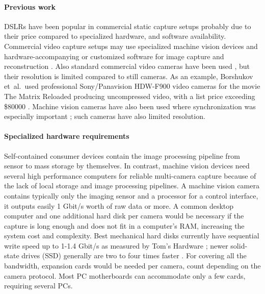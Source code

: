 \paragraph{Previous work}
DSLRs have been popular in commercial static capture setups \cite{ir-ltd,ten24,capturelab,agisoftforum,winder2008technical} probably due to their price compared to specialized hardware, and software availability.
Commercial video capture setups may use specialized machine vision devices and hardware-accompanying or customized software for image capture and reconstruction \cite{al2013new}.
Also standard commercial video cameras have been used \cite{bradley2010high}, but their resolution is limited compared to still cameras.
As an example, Borshukov et~al.\ used professional Sony/Panavision HDW-F900 video cameras for the movie The Matrix Reloaded \cite{borshukov05universal} producing uncompressed video, with a list price exceeding \$80000 \cite{sonyhdwf900r}.
Machine vision cameras have also been used where synchronization was especially important \cite{carceroni2002multi,bickel2007multi}; such cameras have also limited resolution.

\paragraph{Specialized hardware requirements}
Self-contained consumer devices contain the image processing pipeline from sensor to mass storage by themselves.
In contrast, machine vision devices need several high performance computers for reliable multi-camera capture because of the lack of local storage and image processing pipelines.
A machine vision camera contains typically only the imaging sensor and a processor for a control interface, it outputs easily 1 Gbit/s worth of raw data or more.
A common desktop computer and one additional hard disk per camera would be necessary if the capture is long enough and does not fit in a computer's RAM, increasing the system cost and complexity.
Best mechanical hard disks currently have sequential write speed up to 1-1.4 Gbit/s as measured by Tom's Hardware \cite{tomshw-hddwrite};
newer solid-state drives (SSD) generally are two to four times faster \cite{tomshw-ssdwrite}.
For covering all the bandwidth, expansion cards would be needed per camera, count depending on the camera protocol.
Most PC motherboards can accommodate only a few cards, requiring several PCs.

